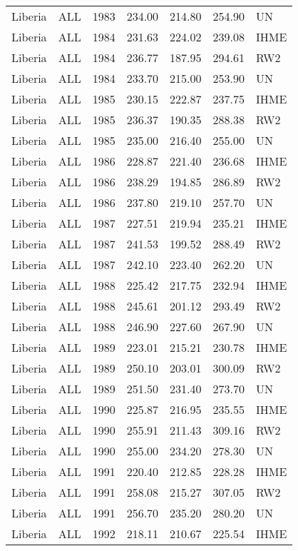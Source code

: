 \begin{longtable}{lllrrrl}
  Liberia & ALL & 1983 & 234.00 & 214.80 & 254.90 & UN \\ 
  Liberia & ALL & 1984 & 231.63 & 224.02 & 239.08 & IHME \\ 
  Liberia & ALL & 1984 & 236.77 & 187.95 & 294.61 & RW2 \\ 
  Liberia & ALL & 1984 & 233.70 & 215.00 & 253.90 & UN \\ 
  Liberia & ALL & 1985 & 230.15 & 222.87 & 237.75 & IHME \\ 
  Liberia & ALL & 1985 & 236.37 & 190.35 & 288.38 & RW2 \\ 
  Liberia & ALL & 1985 & 235.00 & 216.40 & 255.00 & UN \\ 
  Liberia & ALL & 1986 & 228.87 & 221.40 & 236.68 & IHME \\ 
  Liberia & ALL & 1986 & 238.29 & 194.85 & 286.89 & RW2 \\ 
  Liberia & ALL & 1986 & 237.80 & 219.10 & 257.70 & UN \\ 
  Liberia & ALL & 1987 & 227.51 & 219.94 & 235.21 & IHME \\ 
  Liberia & ALL & 1987 & 241.53 & 199.52 & 288.49 & RW2 \\ 
  Liberia & ALL & 1987 & 242.10 & 223.40 & 262.20 & UN \\ 
  Liberia & ALL & 1988 & 225.42 & 217.75 & 232.94 & IHME \\ 
  Liberia & ALL & 1988 & 245.61 & 201.12 & 293.49 & RW2 \\ 
  Liberia & ALL & 1988 & 246.90 & 227.60 & 267.90 & UN \\ 
  Liberia & ALL & 1989 & 223.01 & 215.21 & 230.78 & IHME \\ 
  Liberia & ALL & 1989 & 250.10 & 203.01 & 300.09 & RW2 \\ 
  Liberia & ALL & 1989 & 251.50 & 231.40 & 273.70 & UN \\ 
  Liberia & ALL & 1990 & 225.87 & 216.95 & 235.55 & IHME \\ 
  Liberia & ALL & 1990 & 255.91 & 211.43 & 309.16 & RW2 \\ 
  Liberia & ALL & 1990 & 255.00 & 234.20 & 278.30 & UN \\ 
  Liberia & ALL & 1991 & 220.40 & 212.85 & 228.28 & IHME \\ 
  Liberia & ALL & 1991 & 258.08 & 215.27 & 307.05 & RW2 \\ 
  Liberia & ALL & 1991 & 256.70 & 235.20 & 280.20 & UN \\ 
  Liberia & ALL & 1992 & 218.11 & 210.67 & 225.54 & IHME \\ 

\end{longtable}
